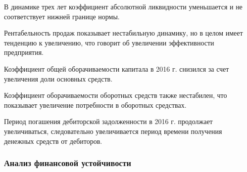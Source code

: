 В динамике трех лет коэффициент абсолютной ликвидности уменьшается и не соответствует нижней границе нормы.

Рентабельность продаж показывает нестабильную динамику, но в целом имеет тенденцию к увеличению, что говорит об увеличении эффективности предприятия.

Коэффициент общей оборачиваемости капитала в 2016 г. снизился за счет увеличения доли основных средств.

Коэффициент оборачиваемости оборотных средств также нестабилен, что показывает увеличение потребности в оборотных средствах.

Период погашения дебиторской задолженности в 2016 г. продолжает увеличиваться, следовательно увеличивается период времени получения денежных средств от дебиторов.










\subsubsection*{Анализ финансовой устойчивости}

